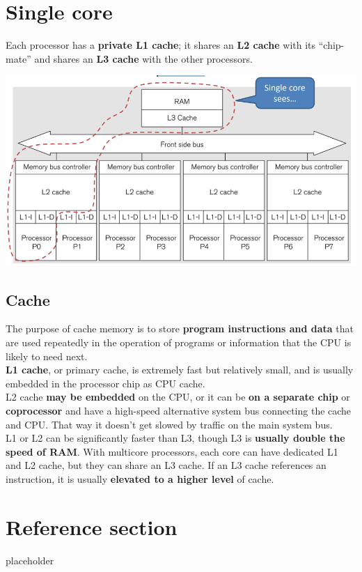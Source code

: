 \documentclass{article}
\begin{document}
\tableofcontents

\newpage

\section{Single core}
\begin{flushleft}
Each processor has a \textbf{private L1 cache}; it shares an \textbf{L2 cache} with its “chip-mate” and shares an \textbf{L3 cache} with the other processors.
\end{flushleft}
\begin{center}
  \includegraphics[scale=0.5]{multi_core_cache.png}
\end{center}

\subsection{Cache}
\begin{flushleft}
The purpose of cache memory is to store \textbf{program instructions and data} that are used repeatedly in the operation of programs or information that the CPU is likely to need next.
\\ \bigskip
\textbf{L1 cache}, or primary cache, is extremely fast but relatively small, and is usually embedded in the processor chip as CPU cache.
\\ \bigskip
L2 cache \textbf{may be embedded} on the CPU, or it can be \textbf{on a separate chip} or \textbf{coprocessor} and have a high-speed alternative system bus connecting the cache and CPU. That way it doesn't get slowed by traffic on the main system bus.
\\ \bigskip
L1 or L2 can be significantly faster than L3, though L3 is \textbf{usually double the speed of RAM}. With multicore processors, each core can have dedicated L1 and L2 cache, but they can share an L3 cache. If an L3 cache references an instruction, it is usually \textbf{elevated to a higher level} of cache.
\end{flushleft}

\pagebreak
\section*{Reference section} \label{sec:reference}
\begin{description}
	\item[placeholder] \hfill \\
\end{description}
\end{document}
